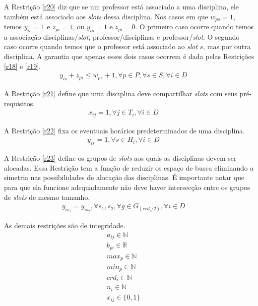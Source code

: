 A Restrição \ref{r20} diz que se um professor está associado a uma disciplina, ele também está associado aos \textit{slots} dessa disciplina. Nos casos em que $w_{ps} = 1$, temos $y_{is} = 1$ e $z_{pi} = 1$, ou $y_{is} = 1$ e $z_{pi} = 0$. O primeiro caso ocorre quando temos a associação disciplinas/\textit{slot}, professor/disciplinas e professor/\textit{slot}. O segundo caso ocorre quando temos que o professor está associado ao \textit{slot} $s$, mas por outra disciplina.
A garantia que apenas esses dois casos ocorrem é dada pelas Restrições \ref{r18} e \ref{r19}. 
\begin{eqnarray}
\label{r20}
y_{is} + z_{pi} \le w_{ps} + 1, \forall{p}\in{P}, \forall{s}\in{S}, \forall{i}\in{D} &&
\end{eqnarray}

A Restrição \ref{r21} define que uma disciplina deve compartilhar \textit{slots} com seus pré-requisitos.
\begin{eqnarray}
\label{r21}
x_{ij} = 1, \forall{j\in{T_i}},\forall{i \in{D}} &&
\end{eqnarray}

A Restrição \ref{r22} fixa os eventuais horários predeterminados de uma disciplina.
\begin{eqnarray}
\label{r22}
y_{is} = 1, \forall{s \in{H_i}}, \forall{i \in{D}} &&
\end{eqnarray}

A Restrição \ref{r23} define os grupos de \textit{slots} aos quais as disciplinas devem ser alocadas. Essa Restrição tem a função de reduzir os espaço de busca eliminando a simetria nas possibilidades de alocação das disciplinas. É importante notar que para que ela funcione adequadamente não deve haver intersecção entre os grupos de \textit{slots} de mesmo tamanho.
\begin{eqnarray}
\label{r23}
y_{is_1} = y_{is_2}, \forall{s_1, s_2}, \forall{g\in{G_{(crd_i/2)}}}, \forall{i\in{D}} &&
\end{eqnarray}

As demais restrições são de integridade.
\begin{eqnarray}
\label{r24}
a_{ij}\in{\mathbb{N}} &&\\
\label{r25}
b_{pi} \in{\mathbb{R}} &&\\
\label{r26}
max_{p} \in{\mathbb{N}} &&\\
\label{r27}
min_{p} \in{\mathbb{N}} &&\\
\label{r28}
crd_{i} \in{\mathbb{N}} &&\\
\label{r29}
n_{i} \in{\mathbb{N}} &&\\
\label{r30}
x_{ij}\in{\{0,1\}} &&
\end{eqnarray}

